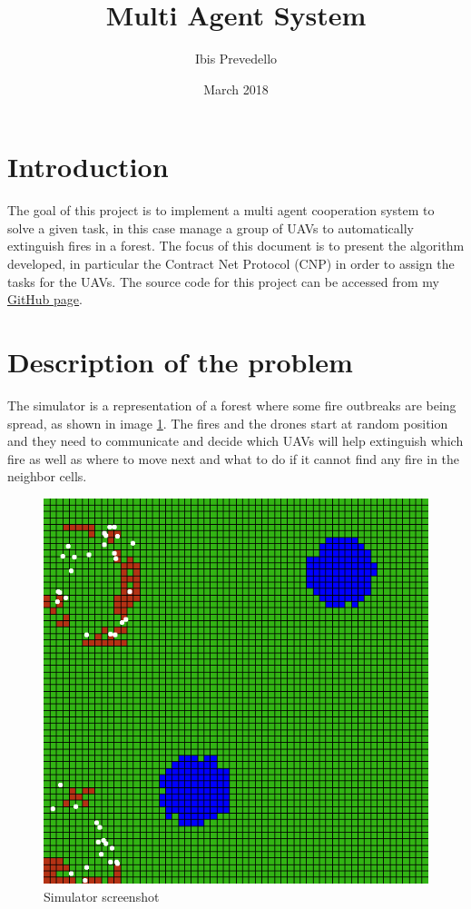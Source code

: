 \documentclass{article}
\title{Multi Agent System}
\date{March 2018}
\author{Ibis Prevedello}
\begin{document}
\maketitle

\section{Introduction}
The goal of this project is to implement a multi agent cooperation system to solve a given task, in this case manage a group of UAVs to automatically extinguish fires in a forest. The focus of this document is to present the algorithm developed, in particular the Contract Net Protocol (CNP) in order to assign the tasks for the UAVs. The source code for this project can be accessed from my \href{https://github.com/ibiscp/Fire-Extinguishers-Drones}{GitHub page}.

\section{Description of the problem}
The simulator is a representation of a forest where some fire outbreaks are being spread, as shown in image \ref{fig:fig1}. The fires and the drones start at random position and they need to communicate and decide which UAVs will help extinguish which fire as well as where to move next and what to do if it cannot find any fire in the neighbor cells.

\begin{figure}[!ht]
\centering
\includegraphics[scale=0.30]{environment}
\caption{Simulator screenshot}
\label{fig:fig1}
\end{figure}
\end{document}
